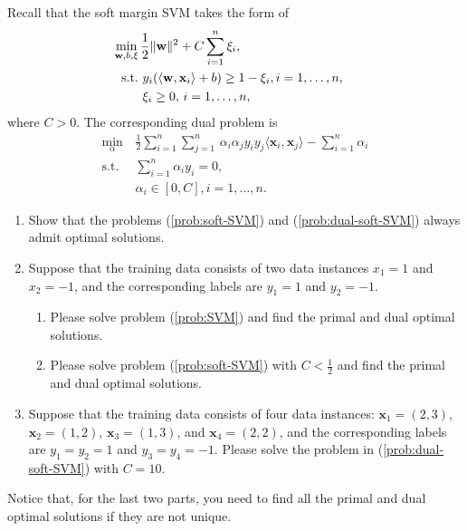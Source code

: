\documentclass[11pt,letter,notitlepage]{article}
\begin{document}
\newpage
\begin{exercise}
     Recall that the soft margin SVM takes the form of
\begin{align}\label{prob:soft-SVM}
\min_{\mathbf{w},b,\xi}\,&\frac{1}{2}\|\mathbf{w}\|^2+C\sum_{i=1}^n\xi_i,\\ \nonumber
{\rm s.t.\,}&\,y_i(\langle\mathbf{w},\mathbf{x}_i\rangle+b)\geq1-\xi_i,i=1,\ldots,n,&\\ \nonumber
&\,\xi_i\geq0,\,i=1,\ldots,n,
\end{align}
where $C>0$.
The corresponding dual problem is
\begin{align}\label{prob:dual-soft-SVM}
		\min_{\alpha}\,&\frac{1}{2}\sum_{i=1}^n\sum_{j=1}^n\,\alpha_i\alpha_jy_iy_j\langle\mathbf{x}_i,\mathbf{x}_j\rangle-\sum_{i=1}^n\alpha_i\\\nonumber
	\mbox{s.t. }\,&\sum_{i=1}^n\alpha_iy_i=0,\\\nonumber
	&\alpha_i\in[0,C],i=1,\ldots,n.
\end{align}
\begin{enumerate}
    \item Show that the problems (\ref{prob:soft-SVM}) and (\ref{prob:dual-soft-SVM}) always admit optimal solutions.
    
    \item Suppose that the training data consists of two data instances $x_1=1$ and $x_2=-1$, and the corresponding labels are $y_1=1$ and $y_2=-1$.
    \begin{enumerate}
        \item Please solve problem (\ref{prob:SVM}) and find the primal and dual optimal solutions.
        \item Please solve problem (\ref{prob:soft-SVM}) with $C<\frac{1}{2}$ and find the primal and dual optimal solutions.
    \end{enumerate}

    \item Suppose that the training data consists of four data instances: $\mathbf{x}_1=(2,3)$, $\mathbf{x}_2=(1,2)$, $\mathbf{x}_3=(1,3)$, and $\mathbf{x}_4=(2,2)$, and the corresponding labels are $y_1=y_2=1$ and $y_3=y_4=-1$. Please solve the problem in (\ref{prob:dual-soft-SVM}) with $C=10$.
\end{enumerate}
Notice that, for the last two parts, you need to find all the primal and dual optimal solutions if they are not unique.
\end{exercise}
\end{document}
